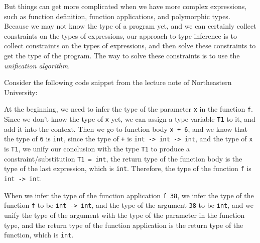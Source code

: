 \documentclass{article}
\begin{document}
    But things can get more complicated when we have more complex expressions, such as function definition, function applications, and polymorphic types.
    Because we may not know the type of a program yet, and we can certainly collect constraints on the types of expressions,
    our approach to type inference is to collect constraints on the types of expressions, and then solve these constraints to get the type of the program.
    The way to solve these constraints is to use the \textit{unification algorithm}.

    Consider the following code snippet from the lecture note of Northeastern University\cite{NEU1}:

    \begin{center}
        \setlength{\fboxsep}{5pt}
    \end{center}

    At the beginning, we need to infer the type of the parameter \texttt{x} in the function \texttt{f}.
    Since we don't know the type of \texttt{x} yet, we can assign a type variable \texttt{T1} to it, and add it into the context.
    Then we go to function body \texttt{x + 6}, and we know that the type of \texttt{6} is \texttt{int}, since the type of \texttt{+} is \texttt{int -> int -> int},
    and the type of \texttt{x} is \texttt{T1}, we unify our conclusion with the type \texttt{T1} to produce a constraint/substitution \texttt{T1 = int}, the return type of the function body
    is the type of the last expression, which is \texttt{int}. Therefore, the type of the function \texttt{f} is \texttt{int -> int}.

    When we infer the type of the function application \texttt{f 38}, we infer the type of the function \texttt{f} to be \texttt{int -> int}, and
    the type of the argument \texttt{38} to be \texttt{int}, and we unify the type of the argument with the type of the parameter in the function type,
    and the return type of the function application is the return type of the function, which is \texttt{int}.
\end{document}
